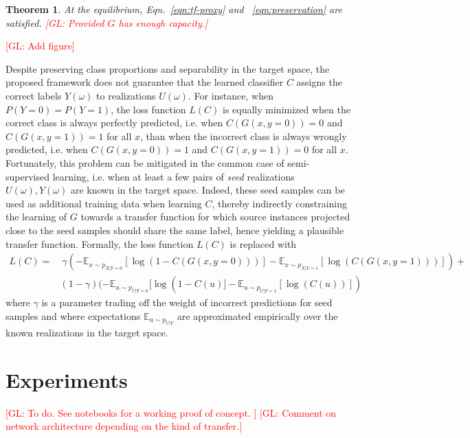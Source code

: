 \documentclass{article}
\newcommand{\glnote}[1]{\textcolor{red}{[GL: #1]}}
\theoremstyle{plain}
\newtheorem{theorem}{Theorem}
\begin{document}
\begin{theorem}
At the equilibrium, Eqn.~\ref{eqn:tf-proxy} and ~\ref{eqn:preservation} are satisfied. \glnote{Provided $G$ has enough capacity.}
\end{theorem}

\glnote{Add figure}

Despite preserving class proportions and separability in the target space, the
proposed framework does not guarantee that the learned classifier $C$ assigns
the correct labels $Y(\omega)$ to realizations $U(\omega)$. For instance, when
$P(Y=0) = P(Y=1)$, the loss function $L(C)$ is equally minimized when the
correct class is always perfectly predicted, i.e. when $C(G(x,y=0)) = 0$ and
$C(G(x,y=1)) = 1$ for all $x$, than when the incorrect class is always wrongly
predicted,  i.e. when $C(G(x,y=0)) = 1$ and $C(G(x,y=1)) = 0$ for all $x$.
Fortunately, this problem can be mitigated in the common case of
semi-supervised learning, i.e. when at least a few pairs of {\it seed}
realizations $U(\omega), Y(\omega)$ are known in the target space. Indeed, these
seed samples can be used as additional training data when learning $C$, thereby
indirectly constraining the learning of $G$ towards a transfer function for
which source instances projected close to the seed samples should share the same
label, hence yielding a plausible transfer function. Formally,
the loss function $L(C)$ is replaced with
\begin{align}\label{eqn:loss-C-semi}
    L(C) =&~ \gamma (-\mathbb{E}_{x \sim p_{X|Y=0}} [\log(1 - C(G(x, y=0)))] -\mathbb{E}_{x \sim p_{X|Y=1}} [\log(C(G(x, y=1)))]) + \nonumber \\
          & (1 - \gamma) (-\mathbb{E}_{u \sim p_{U|Y=0}} [\log(1 - C(u)] -\mathbb{E}_{u \sim p_{U|Y=1}} [\log(C(u))])
\end{align}
where $\gamma$ is a parameter trading off the weight of incorrect predictions for seed samples
and where expectations $\mathbb{E}_{u \sim p_{U|Y}}$ are approximated empirically
over the known realizations in the target space.


\section{Experiments}

\glnote{To do. See notebooks for a working proof of concept. }
\glnote{Comment on network architecture depending on the kind of transfer.}

\end{document}
